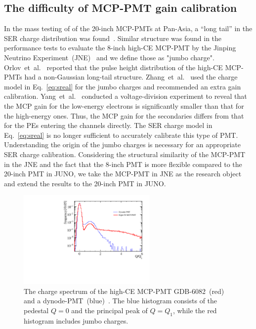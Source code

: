 \subsection{The difficulty of MCP-PMT gain calibration}
In the mass testing of of the 20-inch MCP-PMTs at Pan-Asia, a ``long tail'' in the SER charge distribution was found~\cite{JUNO:2022hlz}. Similar structure was found in the performance tests to evaluate the 8-inch high-CE MCP-PMT by the Jinping Neutrino Experiment~(JNE)~\cite{Zhang:2023ued} and we define those as "jumbo charge".
Orlov~et~al.~\cite{reviewer1} reported that the pulse height distribution of the high-CE MCP-PMTs had a non-Gaussian long-tail structure. Zhang~et~al.~\cite{2021Gain} used the charge model in Eq.~\eqref{eq:sreal} for the jumbo charges and recommended an extra gain calibration. Yang~et~al.~\cite{2017MCP} conducted a voltage-division experiment to reveal that the MCP gain for the low-energy electrons is significantly smaller than that for the high-energy ones.
Thus, the MCP gain for the secondaries differs from that for the PEs entering the channels directly.
The SER charge model in Eq.~\eqref{eq:sreal} is no longer sufficient to accurately calibrate this type of PMT.
Understanding the origin of the jumbo charges is necessary for an appropriate SER charge calibration.
Considering the structural similarity of the MCP-PMT in the JNE and the fact that the 8-inch PMT is more flexible compared to the 20-inch PMT in JUNO, we take the MCP-PMT in JNE as the research object and extend the results to the 20-inch PMT in JUNO.
\begin{figure}[htbp]
	\centering
	\includegraphics[width=0.6\textwidth]{PMTRelated/GTmodel/spe.pdf}
	\caption{The charge spectrum of the high-CE MCP-PMT GDB-6082~(red) and a dynode-PMT~(blue)~\cite{Zhang:2023ued}.
		The blue histogram consists of the pedestal $Q=0$ and the principal peak of $Q=Q_1$, while the red histogram includes jumbo charges.}
	\label{fig:spe_sreal}
\end{figure}


